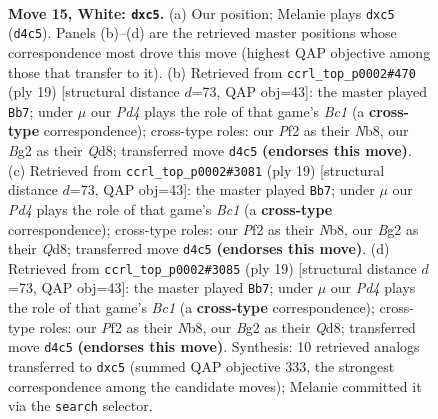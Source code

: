 \documentclass[11pt]{article}
\begin{document}
\clearpage

\begin{figure}[p]\centering
\begin{subfigure}{0.46\textwidth}\centering
\resizebox{\linewidth}{!}{%
\newchessgame
\chessboard[
  setfen={rnbqk2r/8/3b1np1/pppp1p2/3P4/6P1/PP2PPB1/RNBQNRK1 w kq - 0 15},
  showmover=false,
  pgfstyle=straightmove, color=movearrow, markmove={d4-c5}
]}
\caption{}
\end{subfigure}\hfill
\begin{subfigure}{0.46\textwidth}\centering
\resizebox{\linewidth}{!}{%
\newchessgame
\chessboard[
  setfen={rnbqkb1r/5ppp/4pn2/p7/2BP4/4PN1P/5PP1/RNBQK2R b KQkq - 0 10},
  showmover=false,
  pgfstyle=straightmove, color=movearrow, markmove={c8-b7}
]}
\caption{}
\end{subfigure}
\\[4pt]
\begin{subfigure}{0.46\textwidth}\centering
\resizebox{\linewidth}{!}{%
\newchessgame
\chessboard[
  setfen={rnbqkb1r/5ppp/4pn2/p7/2BP4/4PN1P/5PP1/RNBQK2R b KQkq - 0 10},
  showmover=false,
  pgfstyle=straightmove, color=movearrow, markmove={c8-b7}
]}
\caption{}
\end{subfigure}\hfill
\begin{subfigure}{0.46\textwidth}\centering
\resizebox{\linewidth}{!}{%
\newchessgame
\chessboard[
  setfen={rnbqkb1r/5ppp/4pn2/p7/2BP4/4PN1P/5PP1/RNBQK2R b KQkq - 0 10},
  showmover=false,
  pgfstyle=straightmove, color=movearrow, markmove={c8-b7}
]}
\caption{}
\end{subfigure}
\caption{\textbf{Move 15, White: \texttt{dxc5}.} (a) Our position; Melanie plays \texttt{dxc5} (\texttt{d4c5}). Panels (b)--(d) are the retrieved master positions whose correspondence most drove this move (highest QAP objective among those that transfer to it). (b) Retrieved from \texttt{ccrl\_top\_p0002\#470} (ply 19) [structural distance $d$=73, QAP obj=43]: the master played \texttt{Bb7}; under $\mu$ our \emph{Pd4} plays the role of that game's \emph{Bc1} (a \textbf{cross-type} correspondence); cross-type roles: our \emph{P}f2 as their \emph{N}b8, our \emph{B}g2 as their \emph{Q}d8; transferred move \texttt{d4c5} \textbf{(endorses this move)}. (c) Retrieved from \texttt{ccrl\_top\_p0002\#3081} (ply 19) [structural distance $d$=73, QAP obj=43]: the master played \texttt{Bb7}; under $\mu$ our \emph{Pd4} plays the role of that game's \emph{Bc1} (a \textbf{cross-type} correspondence); cross-type roles: our \emph{P}f2 as their \emph{N}b8, our \emph{B}g2 as their \emph{Q}d8; transferred move \texttt{d4c5} \textbf{(endorses this move)}. (d) Retrieved from \texttt{ccrl\_top\_p0002\#3085} (ply 19) [structural distance $d$=73, QAP obj=43]: the master played \texttt{Bb7}; under $\mu$ our \emph{Pd4} plays the role of that game's \emph{Bc1} (a \textbf{cross-type} correspondence); cross-type roles: our \emph{P}f2 as their \emph{N}b8, our \emph{B}g2 as their \emph{Q}d8; transferred move \texttt{d4c5} \textbf{(endorses this move)}. Synthesis: 10 retrieved analogs transferred to \texttt{dxc5} (summed QAP objective 333, the strongest correspondence among the candidate moves); Melanie committed it via the \texttt{search} selector.}
\label{fig:thought-m28}
\end{figure}
\end{document}
